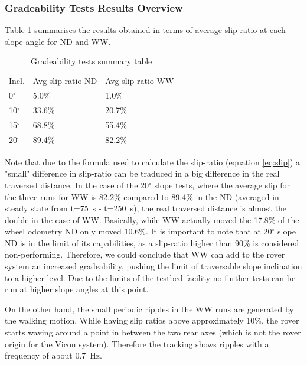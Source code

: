 \documentclass[a4paper,twocolumn]{esapub2005} %
\begin{document}
\subsubsection*{Gradeability Tests Results Overview}
Table \ref{tab:SlopeSummaryTable} summarises the results obtained in terms of average slip-ratio at each slope angle for ND and WW.

\begin{table}[h]
	\begin{tabular}{lll}
	Incl.             & Avg slip-ratio ND & Avg slip-ratio WW \\
	0$^{\circ}$       & 5.0\%             & 1.0\%             \\
	10$^{\circ}$      & 33.6\%            & 20.7\%            \\
	15$^{\circ}$      & 68.8\%            & 55.4\%            \\
	20$^{\circ}$      & 89.4\%            & 82.2\%                
	\end{tabular}
	\caption{Gradeability tests summary table}
	\label{tab:SlopeSummaryTable}
\end{table}

Note that due to the formula used to calculate the slip-ratio (equation \ref{eq:slip}) a "small" difference in slip-ratio can be traduced in a big difference in the real traversed distance. In the case of the 20$^{\circ}$ slope tests, where the average slip for the three runs for WW is 82.2\% compared to 89.4\% in the ND (averaged in steady state from t=75~\unit{s} - t=250~\unit{s}), the real traversed distance is almost the double in the case of WW. Basically, while WW actually moved the 17.8\% of the wheel odometry ND only moved 10.6\%. It is important to note that at 20$^{\circ}$ slope ND is in the limit of its capabilities, as a slip-ratio higher than 90\% is considered non-performing. Therefore, we could conclude that WW can add to the rover system an increased gradeability, pushing the limit of traversable slope inclination to a higher level. Due to the limits of the testbed facility no further tests can be run at higher slope angles at this point.

On the other hand, the small periodic ripples in the WW
runs are generated by the walking motion. While having slip ratios above
approximately 10\%, the rover starts waving around a point in between the two
rear axes (which is not the rover origin for the Vicon system). Therefore the tracking shows ripples
with a frequency of about 0.7~\unit{Hz}.
\end{document}
